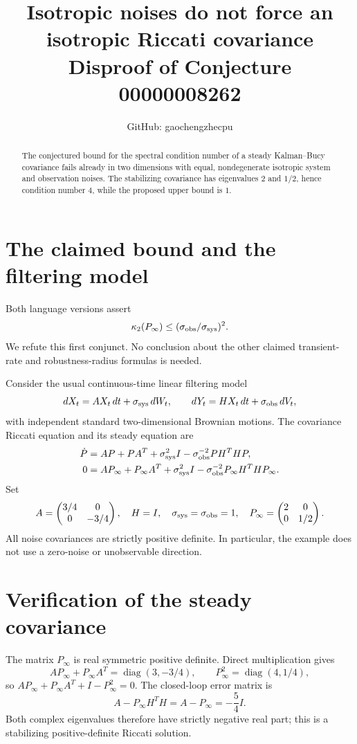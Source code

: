 \documentclass[11pt]{article}
\title{Isotropic noises do not force an isotropic Riccati covariance\\
\large Disproof of Conjecture 00000008262}
\author{GitHub: gaochengzhecpu}\date{}
\begin{document}
\maketitle
\begin{abstract}
The conjectured bound for the spectral condition number of a steady
Kalman--Bucy covariance fails already in two dimensions with equal,
nondegenerate isotropic system and observation noises. The stabilizing
covariance has eigenvalues $2$ and $1/2$, hence condition number $4$,
while the proposed upper bound is $1$.
\end{abstract}

\section*{The claimed bound and the filtering model}
Both language versions assert
\[
 \kappa_2(P_\infty)\leq
       (\sigma_{\rm obs}/\sigma_{\rm sys})^2.
\]
We refute this first conjunct. No conclusion about the other claimed
transient-rate and robustness-radius formulas is needed.

Consider the usual continuous-time linear filtering model
\[
 dX_t=A X_t\,dt+\sigma_{\rm sys}\,dW_t,
 \qquad dY_t=H X_t\,dt+\sigma_{\rm obs}\,dV_t,
\]
with independent standard two-dimensional Brownian motions. The covariance
Riccati equation and its steady equation are
\begin{align*}
 \dot P&=AP+PA^T+\sigma_{\rm sys}^2 I
    -\sigma_{\rm obs}^{-2}PH^THP,\\
 0&=AP_\infty+P_\infty A^T+\sigma_{\rm sys}^2 I
    -\sigma_{\rm obs}^{-2}P_\infty H^THP_\infty.
\end{align*}
Set
\[
 A=\begin{pmatrix}3/4&0\\0&-3/4\end{pmatrix},\quad
 H=I,\quad \sigma_{\rm sys}=\sigma_{\rm obs}=1,\quad
 P_\infty=\begin{pmatrix}2&0\\0&1/2\end{pmatrix}.
\]
All noise covariances are strictly positive definite. In particular,
the example does not use a zero-noise or unobservable direction.

\section*{Verification of the steady covariance}
The matrix $P_\infty$ is real symmetric positive definite. Direct
multiplication gives
\[
 AP_\infty+P_\infty A^T
       =\operatorname{diag}(3,-3/4),\qquad
 P_\infty^2=\operatorname{diag}(4,1/4),
\]
so $AP_\infty+P_\infty A^T+I-P_\infty^2=0$.
The closed-loop error matrix is
\[
 A-P_\infty H^TH=A-P_\infty=-\frac54 I.
\]
Both complex eigenvalues therefore have strictly negative real part;
this is a stabilizing positive-definite Riccati solution.
\end{document}
